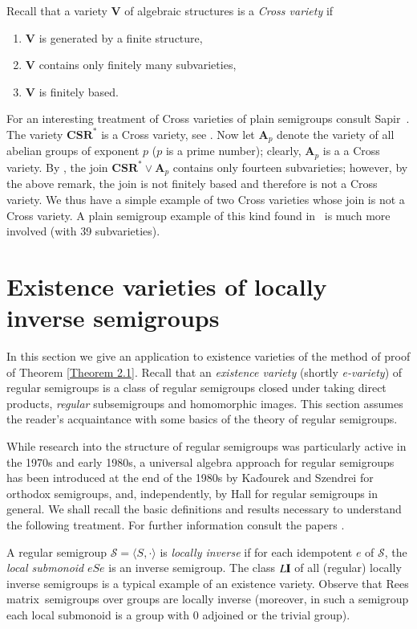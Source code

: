 \documentclass[preprint,1p,times]{elsarticle}
\numberwithin{equation}{section}
\theoremstyle{remark}
\def\pv#1{{\bf #1}}
\def\Vc{\mathbf{V}}
\def\Rm{Rees matrix}
\begin{document}
Recall that a variety $\Vc$ of algebraic structures is a \emph{Cross variety} if
\renewcommand{\labelenumi}{\theenumi)}
\begin{enumerate}
\item $\Vc$ is generated by a finite structure,
\item $\Vc$ contains only finitely many subvarieties,
\item $\Vc$ is finitely based.
\end{enumerate}
For an interesting treatment of Cross varieties of plain semigroups consult Sapir~\cite{S}. The variety
$\mathbf{CSR^*}$ is a Cross variety, see \cite[Theorems 5.1 and 5.2, Corollary 5.4]{A1}. Now let $\mathbf{A}_p$ denote
the variety of all abelian groups of exponent $p$ ($p$ is a prime number); clearly, $\mathbf{A}_p$ is a a Cross
variety. By \cite[Corollaries 5.4 and 6.5]{A1}, the join $\mathbf{CSR^*}\vee\mathbf{A}_p$ contains only fourteen
subvarieties; however, by the above remark, the join is not finitely based and therefore is not a Cross variety. We
thus have a simple example of two Cross varieties whose join is not a Cross variety. A plain semigroup example of this
kind found in~\cite[Corollary 2.1]{S} is much more involved (with 39 subvarieties).

\section{Existence varieties of locally inverse semigroups}

In this section we give an application to existence varieties of the method of proof of Theorem \ref{Theorem 2.1}.
Recall that an \emph{existence variety} (shortly \emph{e-variety}) of regular semigroups is a class of regular
semigroups closed under taking direct products, \emph{regular} subsemigroups and homomorphic images. This section
assumes the reader's acquaintance with some basics of the theory of regular semigroups.

While research into the structure of regular semigroups was particularly active in the 1970s and early 1980s, a
universal algebra approach for regular semigroups has been introduced at the end of the 1980s by Ka\v{d}ourek and
Szendrei \cite{KS} for orthodox semigroups, and, independently, by Hall \cite{H1,H2} for regular semigroups in general.
We shall recall the basic definitions and results necessary to understand the following treatment. For further
information consult the papers \cite{KS,H1,H2,Y1,A2,A3}.

A regular semigroup $\mathcal{S}=\langle S,\cdot\rangle$ is \emph{locally inverse} if for each idempotent $e$ of
$\mathcal S$, the \emph{local submonoid} $eSe$ is an inverse semigroup. The class $L\pv I$ of all (regular) locally
inverse semigroups is a typical example of an existence variety. Observe that \Rm\ semigroups over groups are locally
inverse (moreover, in such a semigroup each local submonoid is a group with 0 adjoined or the trivial group).
\end{document}
